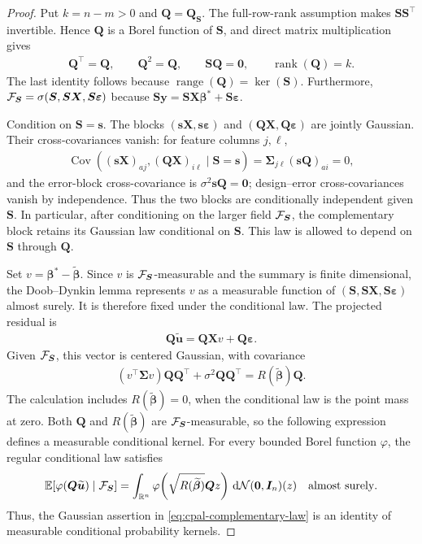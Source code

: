 \documentclass{article}
\theoremstyle{plain}
\theoremstyle{definition}
\theoremstyle{definition}
\newcommand{\boldzero}{\mathbf{0}}
\def\R{{\mathbb{R}}}
\def\E{{\mathbb{E}}}
\def\mathbold{\boldsymbol}
\def\cal{\mathcal}
\def\bI{\mathbold{I}}\def\hbI{{\widehat{\bI}}}\def\tbI{{\widetilde{\bI}}}
\def\calN{{\cal N}}\def\scrN{{\mathscr N}}\def\Nhat{\widehat{N}}\def\Ntil{{\widetilde N}}\def\Nbar{{\overline N}}
\def\bQ{\mathbold{Q}}\def\hbQ{{\widehat{\bQ}}}\def\tbQ{{\widetilde{\bQ}}}
\def\bs{\mathbold{s}}\def\shat{\widehat{s}}\def\stil{\widetilde{s}}\def\sbar{{\overline s}}
\def\bS{\mathbold{S}}\def\hbS{{\widehat{\bS}}}\def\tbS{{\widetilde{\bS}}}
\def\bu{\mathbold{u}}\def\uhat{\widehat{u}}\def\util{\widetilde{u}}\def\ubar{{\overline u}}
\def\bX{\mathbold{X}}\def\hbX{{\widehat{\bX}}}\def\tbX{{\tilde{\bX}}}\def\bXbar{{\overline \bX}}
\def\by{\mathbold{y}}\def\yhat{\widehat{y}}\def\ytil{\widetilde{y}}\def\ybar{{\overline y}}\def\vby{{\bf y}}
\def\bbeta{\mathbold{\beta}}\def\betahat{\widehat{\beta}}\def\hbeta{\widehat{\beta}}
\def\ep{\varepsilon}\def\eps{\epsilon}\def\veps{\varepsilon}
\def\bep{ {\mathbold{\ep} }}
\def\bSigma{\mathbold{\Sigma}}\def\hbSigma{{\widehat{\bSigma}}}
\begin{document}
\begin{proof}
Put $k=n-m>0$ and $\bQ=\bQ_{\bS}$. The full-row-rank
assumption makes $\bS\bS^\top$ invertible. Hence $\bQ$ is a Borel
function of $\bS$, and direct matrix multiplication gives
\begin{align*}
    \bQ^\top=\bQ,\qquad \bQ^2=\bQ,\qquad
    \bS\bQ=\boldzero,\qquad \operatorname{rank}(\bQ)=k.
\end{align*}
The last identity follows because $\operatorname{range}(\bQ)=\ker(\bS)$.
     Furthermore, $\calF_{\bS}=\sigma(\bS,\bS\bX,\bS\bep)$ because
$\bS\by=\bS\bX\bbeta^*+\bS\bep$. 

Condition on $\bS=\bs$. The blocks
$(\bs\bX,\bs\bep)$ and $(\bQ\bX,\bQ\bep)$ are jointly Gaussian.
Their cross-covariances vanish: for feature columns $j,\ell$,
\begin{align*}
    \operatorname{Cov}\!\left(
      (\bs\bX)_{aj},(\bQ\bX)_{i\ell}\mid\bS=\bs
    \right)
    =\bSigma_{j\ell}(\bs\bQ)_{ai}=0,
\end{align*}
and the error-block cross-covariance is
$\sigma^2\bs\bQ=\boldzero$; design--error cross-covariances vanish by
independence. Thus the two blocks are conditionally independent given
$\bS$. In particular, after conditioning on the larger field
$\calF_{\bS}$, the complementary block retains its Gaussian law
conditional on $\bS$. This law is allowed to depend on $\bS$ through
$\bQ$.

Set $v=\bbeta^*-\widetilde{\bbeta}$. Since $v$ is
$\calF_{\bS}$-measurable and the summary is finite dimensional, the
Doob--Dynkin lemma represents $v$ as a measurable function of
$(\bS,\bS\bX,\bS\bep)$ almost surely. It is therefore fixed under the
conditional law. The projected residual is
\begin{align*}
    \bQ\widetilde{\bu}=\bQ\bX v+\bQ\bep.
\end{align*}
Given $\calF_{\bS}$, this vector is centered Gaussian, with covariance
\begin{align*}
    (v^\top\bSigma v)\bQ\bQ^\top
       +\sigma^2\bQ\bQ^\top
    =R(\widetilde{\bbeta})\bQ.
\end{align*}
The calculation includes $R(\widetilde{\bbeta})=0$, when the conditional
law is the point mass at zero. Both $\bQ$ and $R(\widetilde{\bbeta})$ are
$\calF_{\bS}$-measurable, so the following expression defines a measurable
conditional kernel. For every bounded Borel
function $\varphi$, the regular conditional law satisfies
\begin{align*}
    \E[\varphi(\bQ\widetilde{\bu})\mid\calF_{\bS}]
    =\int_{\R^n}
      \varphi\!\left(\sqrt{R(\widetilde{\bbeta})}
        \bQ z\right)\,\mathrm d\calN(\boldzero,\bI_n)(z)
    \quad\text{almost surely}.
\end{align*}
Thus, the Gaussian assertion in \eqref{eq:cpal-complementary-law} is an
identity of measurable conditional probability kernels.


\end{proof}
\end{document}
